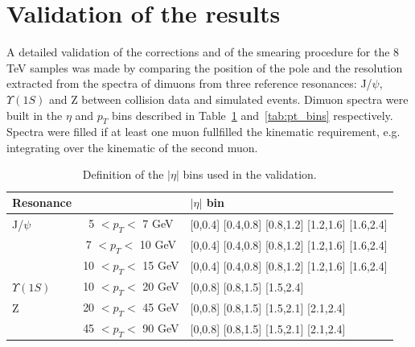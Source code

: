 \section{Validation of the results}
A detailed validation of the corrections and
of the smearing procedure for the 8 TeV samples was made by comparing the
position of the pole and the resolution extracted from the spectra of dimuons from
three reference resonances: J/$\psi$, $\Upsilon(1S)$ and Z between
collision data and simulated events. 
Dimuon spectra were built in the $\eta$ and $p_T$ bins described in
Table~\ref{tab:eta_bins} and~\ref{tab:pt_bins} respectively. 
Spectra were filled if at least one muon fullfilled the
kinematic requirement, e.g. integrating over the kinematic of the
second muon.
\begin{table}[hbH]
\begin{center}
\caption{Definition of the $|\eta|$ bins used in the validation.\label{tab:eta_bins}}
\begin{tabular}{|l|cl|}
\hline
Resonance & & $|\eta|$ bin \\
\hline
J/$\psi$      &  5  $<p_T<$  7 GeV & [0,0.4] [0.4,0.8] [0.8,1.2] [1.2,1.6] [1.6,2.4] \\
              &  7  $<p_T<$ 10 GeV & [0,0.4] [0.4,0.8] [0.8,1.2] [1.2,1.6] [1.6,2.4] \\
              & 10  $<p_T<$ 15 GeV & [0,0.4] [0.4,0.8] [0.8,1.2] [1.2,1.6] [1.6,2.4] \\
\hline                    
$\Upsilon(1S)$& 10  $<p_T<$ 20 GeV & [0,0.8] [0.8,1.5] [1.5,2.4]\\
\hline                    
Z             & 20  $<p_T<$ 45 GeV & [0,0.8] [0.8,1.5] [1.5,2.1] [2.1,2.4] \\
              & 45  $<p_T<$ 90 GeV & [0,0.8] [0.8,1.5] [1.5,2.1] [2.1,2.4] \\
\hline
\end{tabular}
\end{center}
\end{table}
